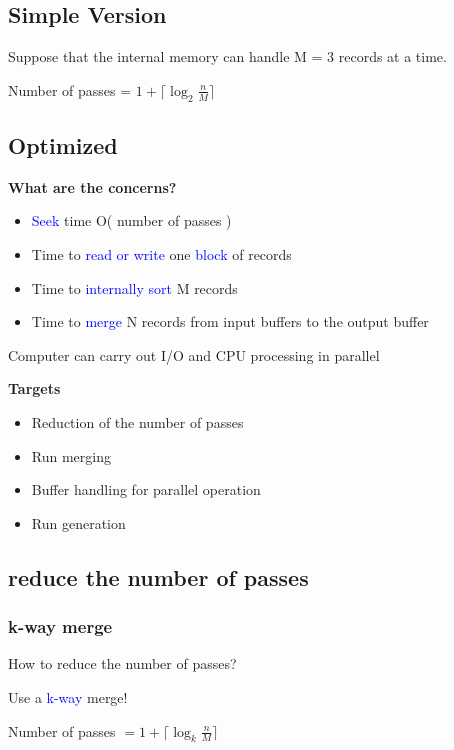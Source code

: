 \documentclass{article}
\begin{document}
\subsection{Simple Version}

Suppose that the internal memory can handle M = 3 records at a time.

Number of passes = $ 1 + \lceil \log_2\frac{n}{M} \rceil$

\subsection{Optimized}

\textbf{What are the concerns?}
\begin{itemize}
    \item \textcolor{blue}{Seek} time O( number of passes )
    \item Time to \textcolor{blue}{read or write} one \textcolor{blue}{block} of records
    \item Time to \textcolor{blue}{internally sort} M records
    \item Time to \textcolor{blue}{merge} N records from input buffers to the output buffer
\end{itemize}

Computer can carry out I/O and CPU processing in parallel

\textbf{Targets}
\begin{itemize}
    \item Reduction of the number of passes
    \item Run merging
    \item Buffer handling for parallel operation
    \item Run generation
\end{itemize}

\subsection{reduce the number of passes} 

\subsubsection{k-way merge}

How to reduce the number of passes?

Use a \textcolor{blue}{k-way} merge!

Number of passes $ = 1 + \lceil \log_k\frac{n}{M} \rceil$
\end{document}
